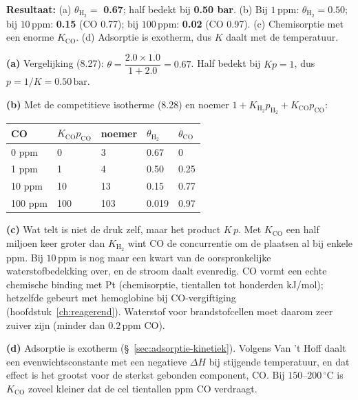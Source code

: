 \begin{oplossing}
\textbf{Resultaat:} (a) \(\theta_{\mathrm{H_2}} =\) \textbf{0.67}; half bedekt bij \textbf{0.50 bar}. (b) Bij \(1\,\mathrm{ppm}\): \(\theta_{\mathrm{H_2}} = 0.50\); bij \(10\,\mathrm{ppm}\): \textbf{0.15} (CO 0.77); bij \(100\,\mathrm{ppm}\): \textbf{0.02} (CO 0.97). (c) Chemisorptie met een enorme \(K_{\mathrm{CO}}\). (d) Adsorptie is exotherm, dus \(K\) daalt met de temperatuur.

\textbf{(a)} Vergelijking (8.27): \(\theta = \dfrac{2.0 \times 1.0}{1 + 2.0} = 0.67\). Half bedekt bij \(K p = 1\), dus \(p = 1/K = 0.50\,\mathrm{bar}\).

\textbf{(b)} Met de competitieve isotherme (8.28) en noemer \(1 + K_{\mathrm{H_2}}p_{\mathrm{H_2}} + K_{\mathrm{CO}}p_{\mathrm{CO}}\):

\begin{center}
\begin{tabular}{lllll}
\toprule
CO & \(K_{\mathrm{CO}}p_{\mathrm{CO}}\) & noemer & \(\theta_{\mathrm{H_2}}\) & \(\theta_{\mathrm{CO}}\) \\
\midrule
0 ppm & 0 & 3 & 0.67 & 0 \\
1 ppm & 1 & 4 & 0.50 & 0.25 \\
10 ppm & 10 & 13 & 0.15 & 0.77 \\
100 ppm & 100 & 103 & 0.019 & 0.97 \\
\bottomrule
\end{tabular}
\end{center}

\textbf{(c)} Wat telt is niet de druk zelf, maar het product \(K\,p\). Met \(K_{\mathrm{CO}}\) een half miljoen keer groter dan \(K_{\mathrm{H_2}}\) wint CO de concurrentie om de plaatsen al bij enkele ppm. Bij \(10\,\mathrm{ppm}\) is nog maar een kwart van de oorspronkelijke waterstofbedekking over, en de stroom daalt evenredig. CO vormt een echte chemische binding met Pt (chemisorptie, tientallen tot honderden kJ/mol); hetzelfde gebeurt met hemoglobine bij CO-vergiftiging (hoofdstuk~\ref{ch:reagerend}). Waterstof voor brandstofcellen moet daarom zeer zuiver zijn (minder dan \(0.2\,\mathrm{ppm}\) CO).

\textbf{(d)} Adsorptie is exotherm (\S~\ref{sec:adsorptie-kinetiek}). Volgens Van 't Hoff daalt een evenwichtsconstante met een negatieve \(\Delta H\) bij stijgende temperatuur, en dat effect is het grootst voor de sterkst gebonden component, CO. Bij \(150\)--\(200\,^\circ\mathrm{C}\) is \(K_{\mathrm{CO}}\) zoveel kleiner dat de cel tientallen ppm CO verdraagt.
\end{oplossing}

